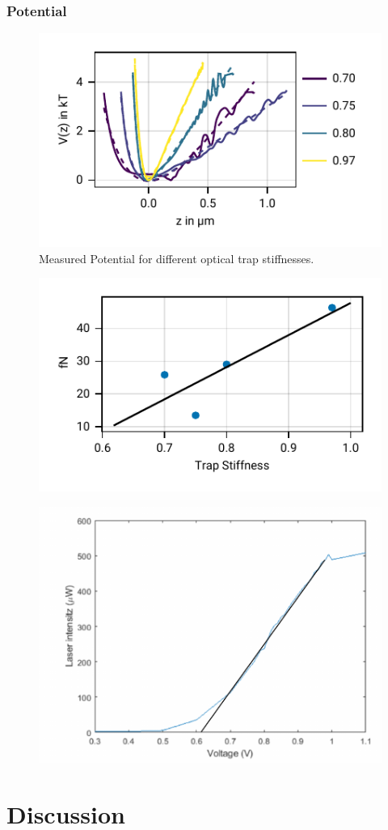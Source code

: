 \documentclass[
    twoside=false,
    twocolumn=true,
    fontsize=11pt,
]{scrarticle}
\begin{document}
\subsubsection*{Potential}
\begin{figure}
    \centering
    \includegraphics{figures/02_05_01_potential.pdf}
    \caption{Measured Potential for different optical trap stiffnesses.}
\end{figure}
\begin{figure}
    \centering
    \includegraphics{figures/02_05_02_gravity.pdf}
\end{figure}
\begin{figure}
    \centering
    \includegraphics{figures/laser_linearity.pdf}
\end{figure}


\section{Discussion}

\nocite{*}
\printbibliography
\end{document}
